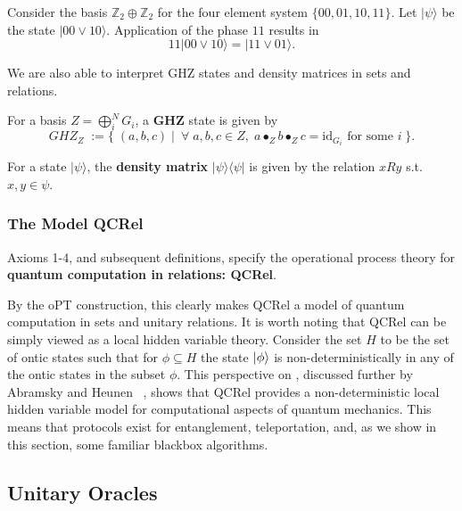 \begin{example}
Consider the basis $\mathbb{Z}_2\oplus\mathbb{Z}_2$ for the four element system $\{00,01,10,11\}$.  Let $|\psi\rangle$ be the state $|00\vee10\rangle$. Application of the phase $11$ results in
\[ 11|00\vee10\rangle = |11\vee01\rangle . \]
\end{example}

We are also able to interpret GHZ states and density matrices in sets and relations.

\begin{defn}
For a basis $Z=\bigoplus_i^NG_i$, a \textbf{GHZ} state is given by
\[ GHZ_Z \; := \{\;(a,b,c)\;|\;\ \forall \;a,b,c \in Z,\;a\bullet_Zb\bullet_Zc = \mbox{id}_{G_i}\mbox{ for some } i\;\}.  \]
\end{defn}

\begin{defn}
For a state $|\psi\rangle$, the \textbf{density matrix} $|\psi\rangle\langle\psi|$ is given by the relation $xRy$ s.t. $x,y\in \psi$.
\end{defn}

\subsubsection*{The Model QCRel}

\begin{defn}
Axioms 1-4, and subsequent definitions, specify the operational process theory for \textbf{quantum computation in relations: QCRel}.
\end{defn}

By the oPT construction, this clearly makes QCRel a model of quantum computation in sets and unitary relations. It is worth noting that QCRel can be simply viewed as a local hidden variable theory. Consider the set $H$ to be the set of ontic states such that for $\phi\subseteq H$ the state $| \phi \rangle$ is non-deterministically in any of the ontic states in the subset $\phi$.  This perspective on , discussed further by Abramsky and Heunen~ \cite{abramsky2012operational}, shows that QCRel provides a non-deterministic local hidden variable model for computational aspects of quantum mechanics. This means that protocols exist for entanglement, teleportation, and, as we show in this section, some familiar blackbox algorithms.

\subsection{Unitary Oracles}

